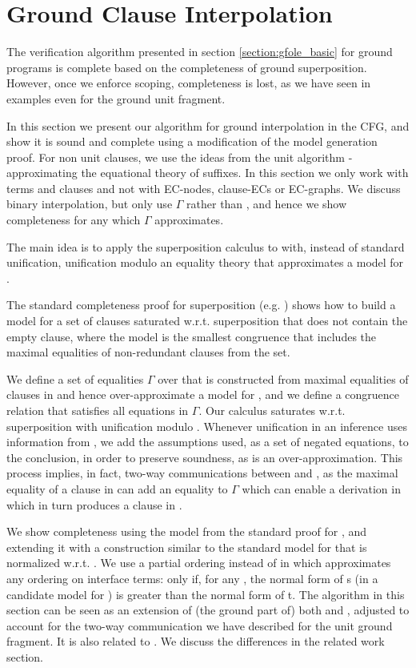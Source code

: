 \section{Ground Clause Interpolation}\label{section:scoping:gfole}
The verification algorithm presented in section \ref{section:gfole_basic} for ground programs is complete based on the completeness of ground superposition. However, once we enforce scoping, completeness is lost, as we have seen in examples even for the ground unit fragment.

In this section we present our algorithm for ground interpolation in the CFG, and show it is sound and complete using a modification of the model generation proof.
For non unit clauses, we use the ideas from the unit algorithm - approximating the equational theory of suffixes.
In this section we only work with terms and clauses and not with EC-nodes, clause-ECs or EC-graphs.
We discuss binary interpolation, but only use $\Gamma$ rather than , 
and hence we show completeness for any  which $\Gamma$ approximates.

The main idea is to apply the superposition calculus to  with, instead of standard unification,
 unification modulo an equality theory that approximates a model for .

The standard completeness proof for superposition (e.g. \cite{BachmairGanzingerSuperposition}) shows how to build a model for a set of clauses saturated w.r.t. superposition that does not contain the empty clause, where the model is the smallest congruence that includes the maximal equalities of non-redundant clauses from the set. 

We define a set of equalities $\Gamma$ over \langI{} that is constructed from maximal equalities of clauses in  and hence over-approximate a model for , and we define a congruence relation \eqg{} that satisfies all equations in $\Gamma$.
Our calculus saturates  w.r.t. superposition with unification modulo \eqg{}.
Whenever unification in an inference uses information from \eqg{}, we add the assumptions used, as a set of negated equations, to the conclusion, in order to preserve soundness, as \m{=_{\Gamma}} is an over-approximation.
This process implies, in fact, two-way communications between  and , as the maximal equality of a clause in  can add an equality to $\Gamma$ which can enable a derivation in  which in turn produces a clause in .

We show completeness using the model from the standard proof for , and extending it with a construction similar to the standard model for  that is normalized w.r.t. .
We use a partial ordering  instead of \m{\succ} in  which approximates any ordering on interface terms: 
 only if, for any , the normal form of s (in a candidate model for ) is greater than the normal form of t.
The algorithm in this section can be seen as an extension of (the ground part of) both \cite{McMillan08} and \cite{BaumgartnerWaldmann13}, 
adjusted to account for the two-way communication we have described for the unit ground fragment. It is also related to \cite{KovacsVoronkov09}.
We discuss the differences in the related work section.

